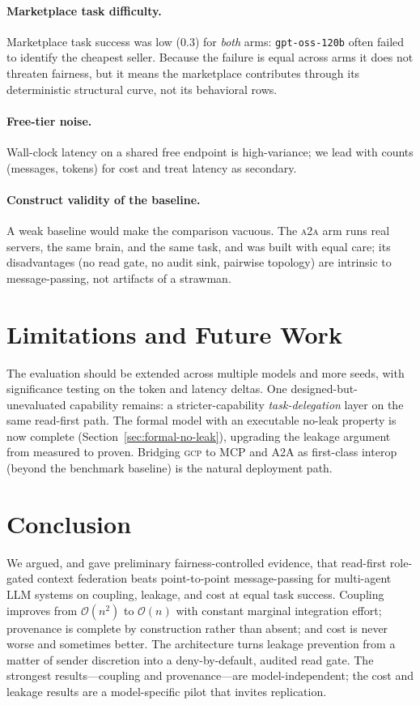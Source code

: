 \documentclass[10pt,twocolumn,letterpaper]{article}
\newcommand{\gcp}{\textsc{gcp}}
\newcommand{\ata}{\textsc{a2a}}
\newcommand{\bigoh}{\mathcal{O}}
\begin{document}
\paragraph{Marketplace task difficulty.} Marketplace task success was low ($0.3$) for \emph{both} arms:
\texttt{gpt-oss-120b} often failed to identify the cheapest seller. Because the failure is equal across
arms it does not threaten fairness, but it means the marketplace contributes through its deterministic
structural curve, not its behavioral rows.

\paragraph{Free-tier noise.} Wall-clock latency on a shared free endpoint is high-variance; we lead with
counts (messages, tokens) for cost and treat latency as secondary.

\paragraph{Construct validity of the baseline.} A weak baseline would make the comparison vacuous. The
\ata{} arm runs real servers, the same brain, and the same task, and was built with equal care; its
disadvantages (no read gate, no audit sink, pairwise topology) are intrinsic to message-passing, not
artifacts of a strawman.

\section{Limitations and Future Work}
The evaluation should be extended across multiple models and more seeds, with significance testing on
the token and latency deltas. One designed-but-unevaluated capability remains: a stricter-capability
\emph{task-delegation} layer on the same read-first path. The formal model with an executable no-leak
property is now complete (Section~\ref{sec:formal-no-leak}), upgrading the leakage argument from
measured to proven. Bridging \gcp{} to MCP and A2A as first-class interop (beyond the benchmark
baseline) is the natural deployment path.

\section{Conclusion}
We argued, and gave preliminary fairness-controlled evidence, that read-first role-gated context
federation beats point-to-point message-passing for multi-agent LLM systems on coupling, leakage, and
cost at equal task success. Coupling improves from $\bigoh(n^2)$ to $\bigoh(n)$ with constant marginal
integration effort; provenance is complete by construction rather than absent; and cost is never worse
and sometimes better. The architecture turns leakage prevention from a matter of sender discretion into
a deny-by-default, audited read gate. The strongest results---coupling and provenance---are
model-independent; the cost and leakage results are a model-specific pilot that invites replication.



\end{document}
